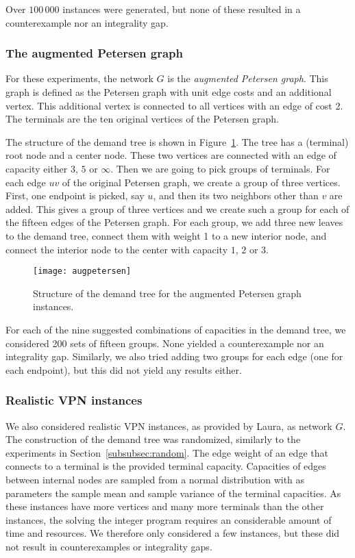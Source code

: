 Over $100\,000$ instances were generated, but none of these resulted in a counterexample nor an integrality gap.

\subsubsection{The augmented Petersen graph}
For these experiments, the network $G$ is the \emph{augmented Petersen graph}.
This graph is defined as the Petersen graph with unit edge costs and an additional vertex.
This additional vertex is connected to all vertices with an edge of cost 2.
The terminals are the ten original vertices of the Petersen graph.

The structure of the demand tree is shown in Figure~\ref{fig:augpetersen}.
The tree has a (terminal) root node and a center node.
These two vertices are connected with an edge of capacity either $3$, $5$ or $\infty$.
Then we are going to pick groups of terminals.
For each edge $uv$ of the original Petersen graph, we create a group of three vertices.
First, one endpoint is picked, say $u$, and then its two neighbors other than $v$ are added.
This gives a group of three vertices and we create such a group for each of the fifteen edges of the Petersen graph.
For each group, we add three new leaves to the demand tree, connect them with weight 1 to a new interior node, and connect the interior node to the center with capacity $1$, $2$ or $3$.

\begin{figure}
    \centering
    \texttt{[image: augpetersen]}
    \caption{Structure of the demand tree for the augmented Petersen graph instances.}
    \label{fig:augpetersen}
\end{figure}

For each of the nine suggested combinations of capacities in the demand tree, we considered 200 sets of fifteen groups.
None yielded a counterexample nor an integrality gap.
Similarly, we also tried adding two groups for each edge (one for each endpoint), but this did not yield any results either.

\subsubsection{Realistic VPN instances}
We also considered realistic VPN instances, as provided by Laura, as network $G$.
The construction of the demand tree was randomized, similarly to the experiments in Section~\ref{subsubsec:random}.
The edge weight of an edge that connects to a terminal is the provided terminal capacity.
Capacities of edges between internal nodes are sampled from a normal distribution with as parameters the sample mean and sample variance of the terminal capacities.
As these instances have more vertices and many more terminals than the other instances, the solving the integer program requires an considerable amount of time and resources.
We therefore only considered a few instances, but these did not result in counterexamples or integrality gaps.

